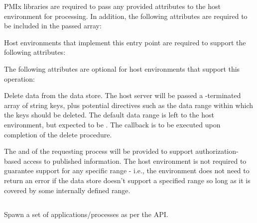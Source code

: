 \reqattrstart
\ac{PMIx} libraries are required to pass any provided attributes to the host environment for processing. In addition, the following attributes are required to be included in the passed  array:


\divider

Host environments that implement this entry point are required to support the following attributes:


\reqattrend

\optattrstart
The following attributes are optional for host environments that support this operation:


\optattrend

\descr

Delete data from the data store.
The host server will be passed a -terminated array of string keys, plus potential directives such as the data range within which the keys should be deleted. The default data range is left to the host environment, but expected to be .
The callback is to be executed upon completion of the delete procedure.

\advicermstart
The  and  of the requesting process will be provided to support authorization-based access to published information. The host environment is not required to guarantee support for any specific range - i.e., the environment does not need to return an error if the data store doesn't support a specified range so long as it is covered by some internally defined range.
\advicermend


\subsection{}

\summary

Spawn a set of applications/processes as per the  API.

\format

